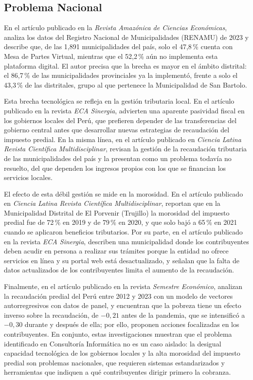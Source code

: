 \documentclass[12pt,a4paper]{report}
\begin{document}
\subsection{Problema Nacional}

En el artículo publicado en la \textit{Revista Amazónica de Ciencias Económicas}, \textcite{francoulco2026} analiza los datos del Registro Nacional de Municipalidades (RENAMU) de 2023 y describe que, de las 1,891 municipalidades del país, solo el 47,8\,\% cuenta con Mesa de Partes Virtual, mientras que el 52,2\,\% aún no implementa esta plataforma digital. El autor precisa que la brecha es mayor en el ámbito distrital: el 86,7\,\% de las municipalidades provinciales ya la implementó, frente a solo el 43,3\,\% de las distritales, grupo al que pertenece la Municipalidad de San Bartolo.

Esta brecha tecnológica se refleja en la gestión tributaria local. En el artículo publicado en la revista \textit{ECA Sinergia}, \textcite{romerocarazas2021} advierten una aparente pasividad fiscal en los gobiernos locales del Perú, que prefieren depender de las transferencias del gobierno central antes que desarrollar nuevas estrategias de recaudación del impuesto predial. En la misma línea, en el artículo publicado en \textit{Ciencia Latina Revista Científica Multidisciplinar}, \textcite{rojasbarbaran2021} revisan la gestión de la recaudación tributaria de las municipalidades del país y la presentan como un problema todavía no resuelto, del que dependen los ingresos propios con los que se financian los servicios locales.

El efecto de esta débil gestión se mide en la morosidad. En el artículo publicado en \textit{Ciencia Latina Revista Científica Multidisciplinar}, \textcite{riosvelasquez2022} reportan que en la Municipalidad Distrital de El Porvenir (Trujillo) la morosidad del impuesto predial fue de 72\,\% en 2019 y de 79\,\% en 2020, y que solo bajó a 65\,\% en 2021 cuando se aplicaron beneficios tributarios. Por su parte, en el artículo publicado en la revista \textit{ECA Sinergia}, \textcite{soriadiaz2022} describen una municipalidad donde los contribuyentes deben acudir en persona a realizar sus trámites porque la entidad no ofrece servicios en línea y su portal web está desactualizado, y señalan que la falta de datos actualizados de los contribuyentes limita el aumento de la recaudación.

Finalmente, en el artículo publicado en la revista \textit{Semestre Económico}, \textcite{cayatopa2026} analizan la recaudación predial del Perú entre 2012 y 2023 con un modelo de vectores autorregresivos con datos de panel, y encuentran que la pobreza tiene un efecto inverso sobre la recaudación, de $-0{,}21$ antes de la pandemia, que se intensificó a $-0{,}30$ durante y después de ella; por ello, proponen acciones focalizadas en los contribuyentes. En conjunto, estas investigaciones muestran que el problema identificado en Consultoría Informática no es un caso aislado: la desigual capacidad tecnológica de los gobiernos locales y la alta morosidad del impuesto predial son problemas nacionales, que requieren sistemas estandarizados y herramientas que indiquen a qué contribuyentes dirigir primero la cobranza.
\end{document}
